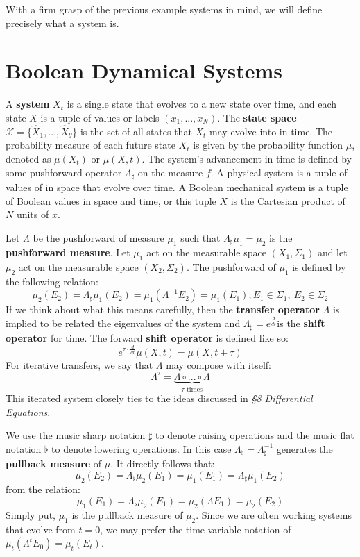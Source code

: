 \documentclass[10pt, a5paper, twoside, openright]{memoir}
\begin{document}
With a firm grasp of the previous example systems in mind, we will define precisely what a system is.

\section{Boolean Dynamical Systems}
A \textbf{system} $X_t$ is a single state that evolves to a new state over time, and each state $X$ is a tuple of values or labels $(x_1,...,x_N)$. The \textbf{state space} $\mathcal X = \{\hat X_1,...,\hat X_\theta \}$ is the set of all states that $X_t$ may evolve into in time. The probability measure of each future state $X_t$ is given by the probability function $\mu$, denoted as $\mu(X_t)$ or $\mu(X, t)$. The system's advancement in time is defined by some pushforward operator $\Lambda_\sharp$ on the measure $f$. A physical system is a tuple of values of in space that evolve over time. A Boolean mechanical system is a tuple of Boolean values in space and time, or this tuple $X$ is the Cartesian product of $N$ units of $x$.

Let $\Lambda$ be the pushforward of measure $\mu_1$ such that $\Lambda_{\sharp} \mu_1 = \mu_2$ is the \textbf{pushforward measure}. Let $\mu_1$ act on the measurable space $(X_1, \Sigma_1)$ and let $\mu_2$ act on the measurable space $(X_2, \Sigma_2)$. The pushforward of $\mu_1$ is defined by the following relation:
$$\mu_2 (E_2) = \Lambda_\sharp \mu_1 (E_2)= \mu_1 (\Lambda^{-1} E_2) = \mu_1 (E_1); E_1 \in \Sigma_1, \ E_2 \in \Sigma_2$$
If we think about what this means carefully, then the \textbf{transfer operator} $\Lambda$ is implied to be related the eigenvalues of the system and $\Lambda_{\sharp} = e^{\frac{d}{d t}}$is the \textbf{shift operator} for time. The forward \textbf{shift operator} is defined like so:
$$e^{\tau \cdot \frac{d}{d t}}\mu (X,t) = \mu(X, t+\tau)$$
For iterative transfers, we say that $\Lambda$ may compose with itself: 
$$\Lambda ^ \tau = \underbrace{\Lambda \circ ... \circ \Lambda}_\text{$\tau$ times}$$
This iterated system closely ties to the ideas discussed in \textit{\S 8 Differential Equations}. 

We use the music sharp notation $\sharp$ to denote raising operations and the music flat notation $\flat$ to denote lowering operations. In this case $\Lambda_\flat = \Lambda_\sharp ^{-1}$ generates the \textbf{pullback measure} of $\mu$. It directly follows that:
$$ \mu_2 (E_2) = \Lambda_\flat \mu_2(E_1) = \mu_1 (E_1) = \Lambda_\sharp \mu_1 (E_2) $$
from the relation:
$$\mu_1 (E_1) = \Lambda_\flat \mu_2(E_1) = \mu_2 (\Lambda E_1) = \mu_2 (E_2)$$
Simply put, $\mu_1$ is the pullback measure of $\mu_2$. Since we are often working systems that evolve from $t=0$, we may prefer the time-variable notation of $\mu_t(\Lambda^t E_0) = \mu_t (E_t)$. 
\end{document}
